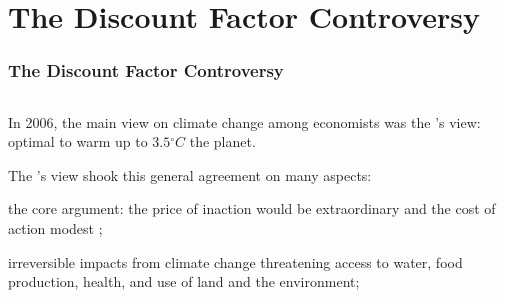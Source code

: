 \documentclass[xcolor=x11names,compress,aspectratio=169]{beamer}%
\makeatletter
\providecommand{\U}[1]{\protect\rule{.1in}{.1in}}
\newenvironment{stepitemizewithalert}{\begin{itemize}[<+-| alert@+>]}{\end{itemize} }
\renewenvironment{itemize}{\begin{compactitemize}[<+-| alert@+>]}{\end{compactitemize}}
\renewenvironment{stepitemizewithalert}{\begin{compactitemize}[<+-| alert@+>]}{\end{compactitemize}}
\renewenvironment{stepitemizewithalert}{\begin{itemize}}{\end{itemize}}
\makeatother
\begin{document}
%
\section{The Discount Factor Controversy}%

\begin{frame}%
%

\frametitle{The Discount Factor Controversy}%


\begin{columns}%
%


\begin{stepitemizewithalert}
\item In 2006, the main view on climate change among economists was the
\cite{nordhaus1992dice}'s view: optimal to warm up to $3.5%
{{}^\circ}%
C$ the planet.%
\vspace{2ex}%


\item The \cite{stern2006stern}'s view shook this general agreement on many
aspects:%
\vspace{1ex}%


\begin{stepitemizewithalert}
\item the core argument: the price of inaction would be extraordinary and the
cost of action modest ;%
\vspace{1ex}%


\item irreversible impacts from climate change threatening access to water,
food production, health, and use of land and the environment;%
\vspace{1ex}%



\end{stepitemizewithalert}
\end{stepitemizewithalert}
\end{columns}
\end{frame}
\end{document}
